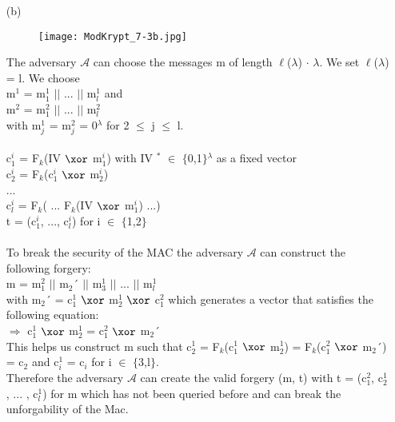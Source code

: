 \begin{itemize}
\item[(b)]

\begin{figure}[h]
    \texttt{[image: ModKrypt\_7-3b.jpg]}
    \centering
\end{figure}

The adversary \(\mathcal{A}\) can choose the messages m of length \(\ell\)(\(\lambda\)) \(\cdot\) \(\lambda\). We set \(\ell\)(\(\lambda\)) = l. We choose \\
m\(^{1}\) = m\(_{1}^{1}\) \(\vert \vert\) ...  \(\vert \vert\)  m\(_{l}^{1}\) and\\ 
m\(^{2}\) = m\(_{1}^{2}\) \(\vert \vert\) ...  \(\vert \vert\)  m\(_{l}^{2}\) \\
with m\(_{j}^{1}\) = m\(_{j}^{2}\) =  0\(^{\lambda}\) for 2 \(\leq\) j \(\leq\) l.\\
\\
c\(_{1}^{i}\) = F\(_{k}\)(IV \(\xor\) m\(_{1}^{i}\)) with IV \(^{*}\) \(\in\) \(\{\)0,1\(\}\)\(^{\lambda}\) as a fixed vector \\
c\(_{2}^{i}\) = F\(_{k}\)(c\(_{1}^{i}\) \(\xor\) m\(_{2}^{i}\))\\
... \\
c\(_{l}^{i}\) = F\(_{k}\)( ... F\(_{k}\)(IV \(\xor\) m\(_{1}^{i}\)) ...) \\
t = (c\(_{1}^{i}\), ..., c\(_{l}^{i}\)) for i \(\in\) \(\{\)1,2\(\}\) \\
\\
To break the security of the MAC the adversary \(\mathcal{A}\) can construct the following forgery: \\
m =  m\(_{1}^{2}\) \(\vert \vert\) m\(_{2}\)´ \(\vert \vert\) m\(_{3}^{1}\) \(\vert \vert\) ...  \(\vert \vert\) m\(_{l}^{1}\) \\
with m\(_{2}\)´ = c\(_{1}^{1}\) \(\xor\) m\(_{2}^{1}\) \(\xor\) c\(_{1}^{2}\) which generates a vector that satisfies the following equation:\\
\(\Rightarrow\) c\(_{1}^{1}\) \(\xor\) m\(_{2}^{1}\) = c\(_{1}^{2}\) \(\xor\) m\(_{2}\)´  \\
This helps us construct m such that c\(_{2}^{1}\) = F\(_{k}\)(c\(_{1}^{1}\) \(\xor\) m\(_{2}^{1}\)) = F\(_{k}\)(c\(_{1}^{2}\) \(\xor\) m\(_{2}\)´) = c\(_{2}\) and c\(_{i}^{1}\) = c\(_{i}\) for i \(\in\) \(\{\)3,l\(\}\).\\
Therefore the adversary \(\mathcal{A}\) can create the valid forgery (m, t) with t = (c\(_{1}^{2}\), c\(_{2}^{1}\), ... , c\(_{l}^{1}\)) for m which has not been queried before and can break the unforgability of the Mac.

\end{itemize}
